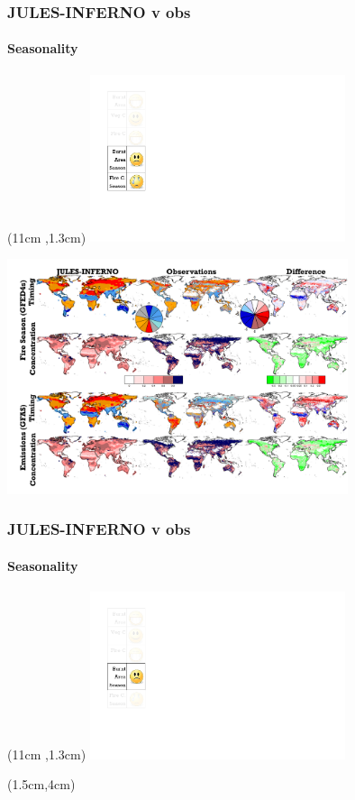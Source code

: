 \begin{frame}[label = kelley2013Datasets]
	\frametitle{JULES-INFERNO v obs}
	\framesubtitle{Seasonality}
	
	\begin{textblock*}{8cm}(11cm ,1.3cm)
		\includegraphics[width=7.5cm]{images/Smileys/BAFireCseason.png}
	\end{textblock*}
	
	\includegraphics[width=10cm]{images/julesPerformance/FireMapsSeason.png}
	
\end{frame}

\begin{frame}[label = kelley2013Datasets]
	\frametitle{JULES-INFERNO v obs}
	\framesubtitle{Seasonality}
	
	\begin{textblock*}{8cm}(11cm ,1.3cm)
		\includegraphics[width=7.5cm]{images/Smileys/BAseason.png}
	\end{textblock*}
	
	\begin{textblock*}{14cm}(1.5cm,4cm)
	\end{textblock*}
\end{frame}

%	

